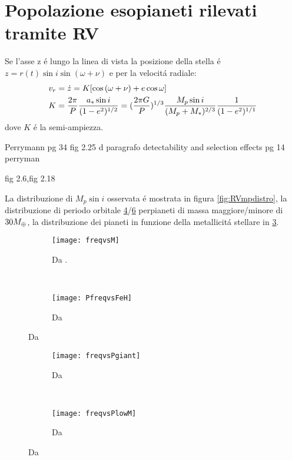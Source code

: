 \section{Popolazione esopianeti rilevati tramite RV}

Se l'asse z \'e lungo la linea di vista la posizione della stella \'e $z=r(t)\sin{i}\sin{(\omega+\nu)}$ e per la velocit\'a radiale:
\begin{align}
&v_r=\dot{z}=K[\cos{(\omega+\nu)}+e\cos{\omega}]\label{eq:vrsignal}\\
&K=\frac{2\pi}{P}\frac{a_*\sin{i}}{(1-e^2)^{1/2}}=(\frac{2\pi G}{P})^{1/3}\frac{M_p\sin{i}}{(M_p+M_*)^{2/3}}\frac{1}{(1-e^2)^{1/1}}
\end{align}
dove $K$ \'e la semi-ampiezza.

\begin{workout}
Perrymann pg 34 fig 2.25 d
paragrafo detectability and selection effects pg 14 perryman
\end{workout}

\begin{workout}
fig 2.6,fig 2.18
\end{workout}


\begin{workout}

La distribuzione di $M_p\sin{i}$ osservata \'e mostrata in figura \ref{fig:RVmpdistro}, la distribuzione di periodo orbitale \ref{fig:PdistroM30}/\ref{fig:Pdistrom30} perpianeti di massa maggiore/minore di $30M_{\oplus}{}$, la distribuzione dei pianeti in funzione della metallicit\'a stellare in \ref{fig:freqZstar}.

\begin{figure}[!ht]
\begin{subfigure}[b]{0.47\textwidth}
\texttt{[image: freqvsM]}
\caption{Da \cite{mayor2011harps}.}\label{fig:Mdistro}
\end{subfigure}
~
\begin{subfigure}[b]{0.47\textwidth}
\texttt{[image: PfreqvsFeH]}\label{fig:freqZstar}
\caption{Da \cite{mayor2011harps}}
\end{subfigure}
\end{figure}

\begin{figure}[!ht]
\begin{subfigure}[b]{0.47\textwidth}
\centering
\texttt{[image: freqvsPgiant]}
\caption{Da \cite{mayor2011harps}}\label{fig:PdistroM30}
\end{subfigure}
~
\begin{subfigure}[b]{0.47\textwidth}
\centering
\texttt{[image: freqvsPlowM]}\label{fig:Pdistrom30}
\caption{Da \cite{mayor2011harps}}
\end{subfigure}
\end{figure}

\end{workout}

